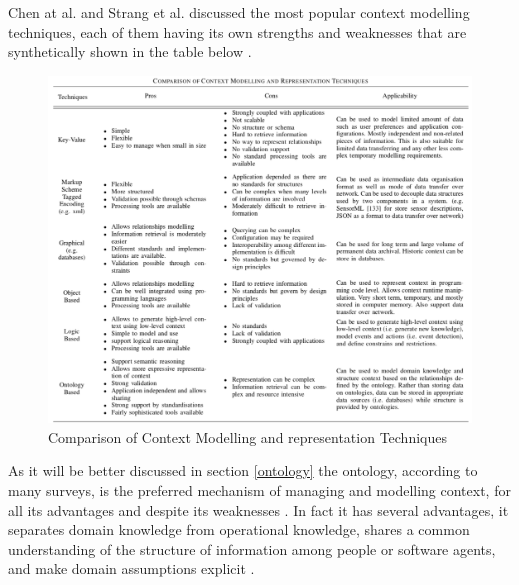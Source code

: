 \documentclass{thesisreport}
\begin{document}
 Chen at al. \cite{chen2000survey} and Strang et al. \cite{strang2004context} discussed the most popular context modelling techniques, each of them having its own strengths and weaknesses that are synthetically shown in the table below \cite{perera2014context}.
 
 	\begin{figure}[H]
		\centering
		\includegraphics[width=17.5cm]{Thesis/data/ContextModelComparison.png}
		\caption{Comparison of Context Modelling and representation Techniques \cite{perera2014context}}
		\label{fig:populationProspect}
	\end{figure}
 As it will be better discussed in section \ref{ontology} the ontology, according to many surveys, is the preferred mechanism of managing and  modelling context, for all its advantages and despite its weaknesses \cite{perera2014context}.
 In fact it has several advantages, it separates domain knowledge from operational knowledge, shares a common understanding of the structure of information among people or software agents, and make domain assumptions explicit \cite{perera2014context}.
 
 
\end{document}
